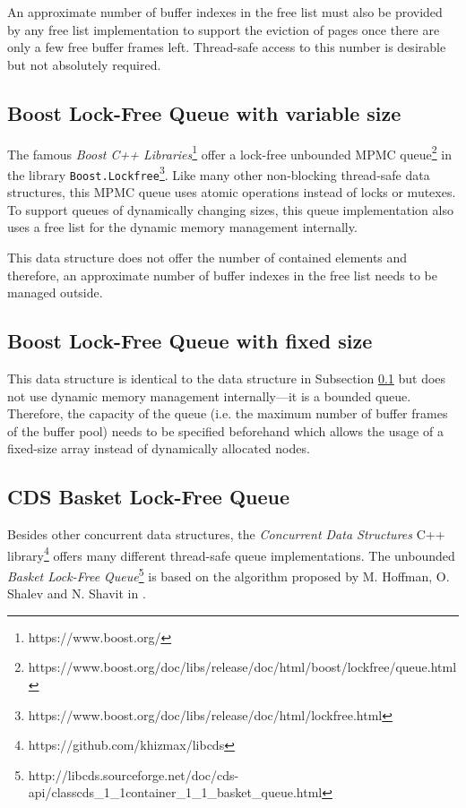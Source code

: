 	An approximate number of buffer indexes in the free list must also be provided by any free list implementation to support the eviction of pages once there are only a few free buffer frames left. Thread-safe access to this number is desirable but not absolutely required.

\subsection[Boost Lock-Free Queue with variable size]{Boost Lock-Free Queue with variable size} \label{subsec:boost}

	The famous \textit{Boost C++ Libraries}\footnote{https://www.boost.org/} offer a lock-free unbounded MPMC queue\footnote{https://www.boost.org/doc/libs/release/doc/html/boost/lockfree/queue.html} in the library \lstinline{Boost.Lockfree}\footnote{https://www.boost.org/doc/libs/release/doc/html/lockfree.html}. Like many other non-blocking thread-safe data structures, this MPMC queue uses atomic operations instead of locks or mutexes. To support queues of dynamically changing sizes, this queue implementation also uses a free list for the dynamic memory management internally.
	
	This data structure does not offer the number of contained elements and therefore, an approximate number of buffer indexes in the free list needs to be managed outside.

\subsection[Boost Lock-Free Queue with fixed size]{Boost Lock-Free Queue with fixed size} \label{subsec:boost-fixed}

	This data structure is identical to the data structure in Subsection \ref{subsec:boost} but does not use dynamic memory management internally---it is a bounded queue. Therefore, the capacity of the queue (i.e. the maximum number of buffer frames of the buffer pool) needs to be specified beforehand which allows the usage of a fixed-size array instead of dynamically allocated nodes.

\subsection[CDS BasketQueue]{CDS Basket Lock-Free Queue} \label{subsec:cds-basket}

	Besides other concurrent data structures, the \textit{Concurrent Data Structures} C++ library\footnote{https://github.com/khizmax/libcds} offers many different thread-safe queue implementations. The unbounded \emph{Basket Lock-Free Queue}\footnote{http://libcds.sourceforge.net/doc/cds-api/classcds\_1\_1container\_1\_1\_basket\_queue.html} is based on the algorithm proposed by M. Hoffman, O. Shalev and N. Shavit in \cite{Hoffman:2007}.
	
